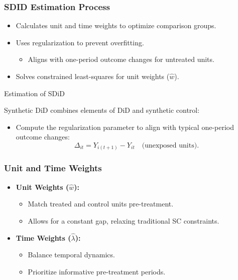 \documentclass{beamer}
\begin{document}
\begin{frame}
\frametitle{SDID Estimation Process}

\begin{itemize}
    \item Calculates unit and time weights to optimize comparison groups.
    \item Uses regularization to prevent overfitting.
        \begin{itemize}
            \item Aligns with one-period outcome changes for untreated units.
        \end{itemize}
    \item Solves constrained least-squares for unit weights (\(\hat{w}\)).
\end{itemize}

\end{frame}

\begin{frame}{Estimation of SDiD}

Synthetic DiD combines elements of DiD and synthetic control:
\begin{itemize}
    \item Compute the regularization parameter to align with typical one-period outcome changes:
    \[
    \Delta_{it} = Y_{i(t+1)} - Y_{it} \quad \text{(unexposed units)}.
    \]
\end{itemize}

\end{frame}





\begin{frame}
\frametitle{Unit and Time Weights}

\begin{itemize}
    \item \textbf{Unit Weights (\(\hat{w}\)):}
        \begin{itemize}
            \item Match treated and control units pre-treatment.
            \item Allows for a constant gap, relaxing traditional SC constraints.
        \end{itemize}
    \item \textbf{Time Weights (\(\hat{\lambda}\)):}
        \begin{itemize}
            \item Balance temporal dynamics.
            \item Prioritize informative pre-treatment periods.
        \end{itemize}
\end{itemize}

\end{frame}
\end{document}
